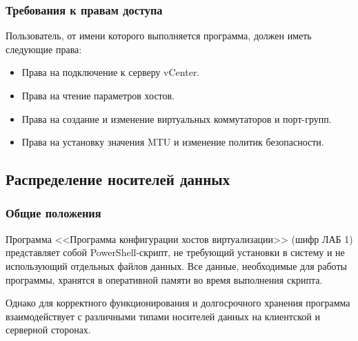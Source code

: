 \subsubsection{Требования к правам доступа}
Пользователь, от имени которого выполняется программа, должен иметь следующие права:
\begin{itemize}
    \item Права на подключение к серверу vCenter.
    \item Права на чтение параметров хостов.
    \item Права на создание и изменение виртуальных коммутаторов и порт-групп.
    \item Права на установку значения MTU и изменение политик безопасности.
\end{itemize}

\subsection{Распределение носителей данных}

\subsubsection{Общие положения}
Программа <<Программа конфигурации хостов виртуализации>> (шифр ЛАБ 1) представляет собой PowerShell-скрипт, не требующий установки в систему и не использующий отдельных файлов данных. Все данные, необходимые для работы программы, хранятся в оперативной памяти во время выполнения скрипта.

Однако для корректного функционирования и долгосрочного хранения программа взаимодействует с различными типами носителей данных на клиентской и серверной сторонах.

